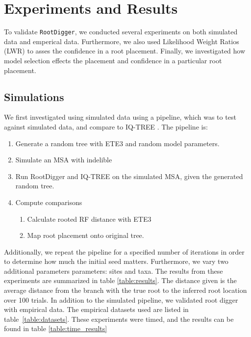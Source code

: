 \documentclass{article}
\newcommand{\RootDiggertt}{\texttt{RootDigger}}
\begin{document}
\section{Experiments and Results}


To validate \RootDiggertt{}, we conducted several experiments on both simulated
data and emperical data. Furthermore, we also used Likelihood Weight Ratios
(LWR) \cite{strimmer_inferring_2002} to asses the confidence in a root
placement. Finally, we investigated how model selection effects the placement
and confidence in a particular root placement.

\subsection{Simulations}

We first investigated using simulated data using a pipeline, which was to test
against simulated data, and compare to IQ-TREE \cite{nguyen_iq-tree:_2015}. The
pipeline is:

\begin{enumerate}
  \item Generate a random tree with ETE3 \cite{huerta-cepas_ete_2016} and random
        model parameters.
  \item Simulate an MSA with indelible \cite{fletcher_indelible:_2009}
  \item Run RootDigger and IQ-TREE \cite{nguyen_iq-tree:_2015} on the simulated MSA, given the generated random tree.
  \item Compute comparisons
        \begin{enumerate}
          \item Calculate rooted RF distance with ETE3 \cite{robinson_comparison_1981}
          \item Map root placement onto original tree.
        \end{enumerate}
\end{enumerate}

Additionally, we repeat the pipeline for a specified number of iterations in
order to determine how much the initial seed matters. Furthermore, we vary two
additional parameters parameters: sites and taxa. The results from these
experiments are summarized in table \ref{table:results}. The distance given is
the average distance from the branch with the true root to the inferred root
location over 100 trials. In addition to the simulated pipeline, we validated
root digger with empirical data. The empirical datasets used are listed in
table~\ref{table:datasets}.  These experiments were timed, and the results can
be found in table \ref{table:time_results}
\end{document}
